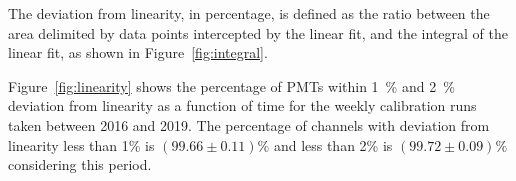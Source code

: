 The deviation from linearity, in percentage, is defined as the ratio between the area delimited by data points intercepted by the linear fit, and the integral of the linear fit, as shown in Figure~\ref{fig:integral}. %

Figure~\ref{fig:linearity} shows the percentage of PMTs within 1~\% and 2~\% deviation from linearity as a function of time for the weekly calibration runs taken between 2016 and 2019. The percentage of channels with deviation from linearity less than 1\% is $(99.66 \pm 0.11)\%$ and less than 2\% is $(99.72 \pm 0.09)\%$ considering this period.


\FloatBarrier